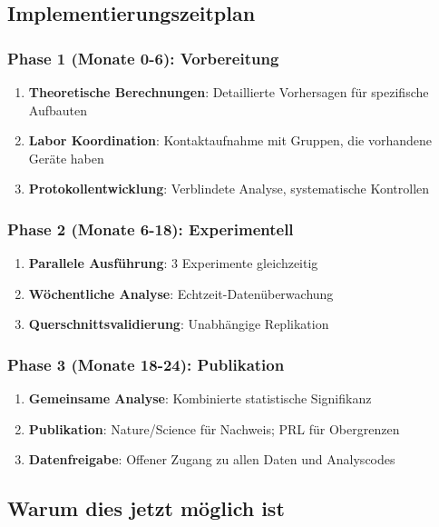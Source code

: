 \documentclass[11pt,a4paper]{article}
\begin{document}
	\subsection{Implementierungszeitplan}
	
	\subsubsection{Phase 1 (Monate 0-6): Vorbereitung}
	
	\begin{enumerate}
		\item \textbf{Theoretische Berechnungen}: Detaillierte Vorhersagen für spezifische Aufbauten
		\item \textbf{Labor Koordination}: Kontaktaufnahme mit Gruppen, die vorhandene Geräte haben
		\item \textbf{Protokollentwicklung}: Verblindete Analyse, systematische Kontrollen
	\end{enumerate}
	
	\subsubsection{Phase 2 (Monate 6-18): Experimentell}
	
	\begin{enumerate}
		\item \textbf{Parallele Ausführung}: 3 Experimente gleichzeitig
		\item \textbf{Wöchentliche Analyse}: Echtzeit-Datenüberwachung
		\item \textbf{Querschnittsvalidierung}: Unabhängige Replikation
	\end{enumerate}
	
	\subsubsection{Phase 3 (Monate 18-24): Publikation}
	
	\begin{enumerate}
		\item \textbf{Gemeinsame Analyse}: Kombinierte statistische Signifikanz
		\item \textbf{Publikation}: Nature/Science für Nachweis; PRL für Obergrenzen
		\item \textbf{Datenfreigabe}: Offener Zugang zu allen Daten und Analyscodes
	\end{enumerate}
	
	\subsection{Warum dies jetzt möglich ist}
	
\end{document}
